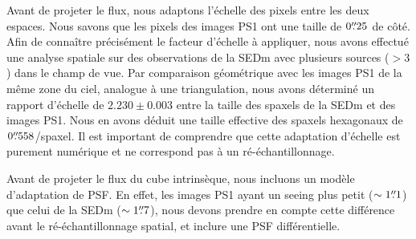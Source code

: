 \documentclass[../main/main.tex]{subfiles}
\begin{document}
Avant de projeter le flux, nous adaptons l'échelle des pixels entre les
deux espaces. Nous savons que les pixels des images PS1 ont une taille
de $0\overset{\prime\prime}{.}25$ de côté. Afin de connaître précisément le facteur
d'échelle à appliquer, nous avons effectué une analyse spatiale sur des
observations de la SEDm avec plusieurs sources ($>3$) dans le
champ de vue. Par comparaison géométrique avec les images PS1 de la même
zone du ciel, analogue à une triangulation, nous avons déterminé un
rapport d'échelle de $2.230\pm0.003$ entre la taille des spaxels de la
SEDm et des images PS1. Nous en avons déduit une taille effective des
spaxels hexagonaux de $0\overset{\prime\prime}{.}558$/spaxel. Il est important de
comprendre que cette adaptation d'échelle est purement numérique et ne correspond pas à
un ré-échantillonnage.

Avant de projeter le flux du cube intrinsèque, nous incluons un modèle
d'adaptation de PSF. En effet, les images PS1 ayant un seeing plus
petit ($\sim1\overset{\prime\prime}{.}1$) que celui de la SEDm ($\sim1\overset{\prime\prime}{.}7$), nous
devons prendre en compte cette différence avant le ré-échantillonnage
spatial, et inclure une PSF différentielle.
\end{document}
